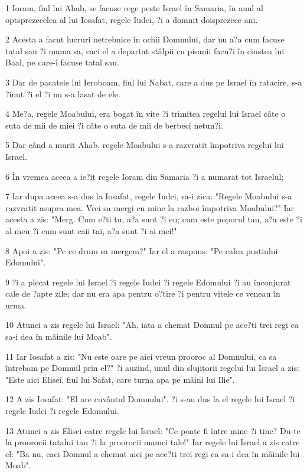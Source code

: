 \par 1 Ioram, fiul lui Ahab, se facuse rege peste Israel în Samaria, în anul al optsprezecelea al lui Iosafat, regele Iudei, ?i a domnit doisprezece ani.
\par 2 Acesta a facut lucruri netrebnice în ochii Domnului, dar nu a?a cum facuse tatal sau ?i mama sa, caci el a departat stâlpii cu pisanii facu?i în cinstea lui Baal, pe care-î facuse tatal sau.
\par 3 Dar de pacatele lui Ieroboam, fiul lui Nabat, care a dus pe Israel în ratacire, s-a ?inut ?i el ?i nu s-a lasat de ele.
\par 4 Me?a, regele Moabului, era bogat în vite ?i trimitea regelui lui Israel câte o suta de mii de miei ?i câte o suta de mii de berbeci netun?i.
\par 5 Dar când a murit Ahab, regele Moabului s-a razvratit împotriva regelui lui Israel.
\par 6 În vremea aceea a ie?it regele Ioram din Samaria ?i a numarat tot Israelul;
\par 7 Iar dupa aceea s-a dus la Iosafat, regele Iudei, sa-i zica: "Regele Moabului s-a razvratit asupra mea. Vrei sa mergi cu mine la razboi împotriva Moabului?" Iar acesta a zis: "Merg. Cum e?ti tu, a?a sunt ?i eu; cum este poporul tau, a?a este ?i al meu ?i cum sunt caii tai, a?a sunt ?i ai mei!"
\par 8 Apoi a zis: "Pe ce drum sa mergem?" Iar el a raspuns: "Pe calea pustiului Edomului".
\par 9 ?i a plecat regele lui Israel ?i regele Iudei ?i regele Edomului ?i au înconjurat cale de ?apte zile; dar nu era apa pentru o?tire ?i pentru vitele ce veneau în urma.
\par 10 Atunci a zis regele lui Israel: "Ah, iata a chemat Domnul pe ace?ti trei regi ca sa-i dea în mâinile lui Moab".
\par 11 Iar Iosafat a zis: "Nu este oare pe aici vreun prooroc al Domnului, ca sa întrebam pe Domnul prin el?" ?i auzind, unul din slujitorii regelui lui Israel a zis: "Este aici Elisei, fiul lui Safat, care turna apa pe mâini lui Ilie".
\par 12 A zis Iosafat: "El are cuvântul Domnului". ?i s-au dus la el regele lui Israel ?i regele Iudei ?i regele Edomului.
\par 13 Atunci a zis Elisei catre regele lui Israel: "Ce poate fi între mine ?i tine? Du-te la proorocii tatalui tau ?i la proorocii mamei tale!" Iar regele lui Israel a zis catre el: "Ba nu, caci Domnul a chemat aici pe ace?ti trei regi ca sa-i dea în mâinile lui Moab".
